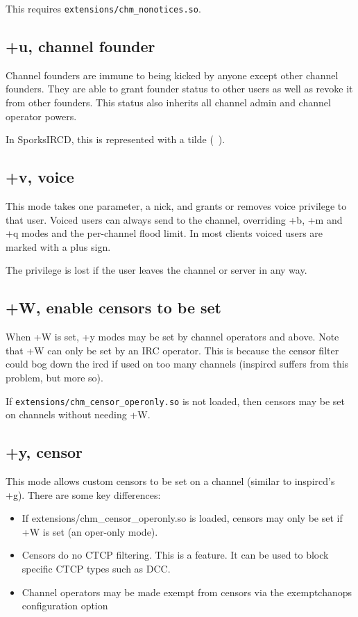 	This requires \nolinkurl{extensions/chm\_nonotices.so}.

\subsection{+u, channel founder}
        Channel founders are immune to being kicked by anyone except other
	channel founders.  They are able to grant founder status to other users
	as well as revoke it from other founders.  This status also inherits all
	channel admin and channel operator powers.

	In SporksIRCD, this is represented with a tilde (~).

\subsection{+v, voice}
	This mode takes one parameter, a nick, and grants or removes voice
	privilege to that user. Voiced users can always send to the channel,
	overriding +b, +m and +q modes and the per-{}channel flood limit. In
	most clients voiced users are marked with a plus sign.


	The privilege is lost if the user leaves the channel or server in any
	way.

\subsection{+W, enable censors to be set}
	When +W is set, +y modes may be set by channel operators and above.
	Note that +W can only be set by an IRC operator. This is because the
	censor filter could bog down the ircd if used on too many channels
	(inspircd suffers from this problem, but more so).

	If \nolinkurl{extensions/chm\_censor\_operonly.so} is not loaded, then
	censors may be set on channels without needing +W.

\subsection{+y, censor}
	This mode allows custom censors to be set on a channel (similar to
	inspircd's +g). There are some key differences:
	\begin{itemize}

	\item{%
		If extensions/chm\_censor\_operonly.so is loaded, censors may
		only be set if +W is set (an oper-{}only mode).
	}

	\item{%
		Censors do no CTCP filtering. This is a feature. It can be used
		to block specific CTCP types such as DCC.
	}

	\item{%
		Channel operators may be made exempt from censors via the
		exemptchanops configuration option
	}

	\end{itemize}

